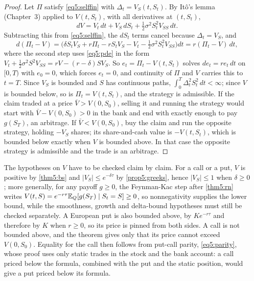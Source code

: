 \begin{chapterrefs}
\begin{proof}
Let $\Pi$ satisfy \cref{eq5:selffin} with $\Delta_t=V_S(t,S_t)$. By It\^o's lemma (Chapter~3)
applied to $V(t,S_t)$, with all derivatives at $(t,S_t)$,
\begin{equation*}
  dV=V_t\,dt+V_S\,dS_t+\tfrac12\sigma^2S_t^2V_{SS}\,dt .
\end{equation*}
Subtracting this from \cref{eq5:selffin}, the $dS_t$ terms cancel because $\Delta_t=V_S$, and
\begin{equation*}
  d(\Pi_t-V)=\bigl(\delta S_tV_S+r\Pi_t-rS_tV_S-V_t-\tfrac12\sigma^2S_t^2V_{SS}\bigr)dt
  =r(\Pi_t-V)\,dt,
\end{equation*}
where the second step uses \cref{eq5:pde} in the form $V_t+\tfrac12\sigma^2S^2V_{SS}=rV-(r-\delta)SV_S$.
So $e_t=\Pi_t-V(t,S_t)$ solves $de_t=re_t\,dt$ on $[0,T)$ with $e_0=0$, which forces $e_t=0$, and
continuity of $\Pi$ and $V$ carries this to $t=T$. Since $V_S$ is bounded and $S$ has continuous
paths, $\int_0^T\Delta_t^2S_t^2\,dt<\infty$; since $V$ is bounded below, so is $\Pi_t=V(t,S_t)$, and
the strategy is admissible. If the claim traded at a price
$\bar V>V(0,S_0)$, selling it and running the strategy would start with $\bar V-V(0,S_0)>0$ in the bank and end
with exactly enough to pay $g(S_T)$, an arbitrage. If $\bar V<V(0,S_0)$, buy the claim and run the
opposite strategy, holding $-V_S$ shares; its share-and-cash value is $-V(t,S_t)$, which is bounded
below exactly when $V$ is bounded above. In that case the opposite strategy is admissible and the
trade is an arbitrage.
\end{proof}

The hypotheses on $V$ have to be checked claim by claim. For a call or a put, $V$ is positive by
\cref{thm5:bs} and $|V_S|\le e^{-\delta\tau}$ by \cref{prop5:greeks}, hence $|V_S|\le1$ when $\delta\ge0$; more generally, for any payoff $g\ge0$, the
Feynman-Kac step after \cref{thm5:rn} writes $V(t,S)=e^{-r\tau}\mathbb{E}_Q[g(S_T)\mid S_t=S]\ge0$, so
nonnegativity supplies the lower bound, while the smoothness, growth and delta-bound hypotheses must
still be checked separately. A European put is also bounded above, by $Ke^{-r\tau}$ and therefore by $K$ when $r\ge0$, so its
price is pinned from both sides. A call is not bounded above, and the theorem gives only that its price cannot exceed
$V(0,S_0)$. Equality for the call then follows from put-call parity, \cref{eq5:parity}, whose proof
uses only static trades in the stock and the bank account: a call priced below the formula, combined
with the put and the static position, would give a put priced below its formula.


\end{chapterrefs}
